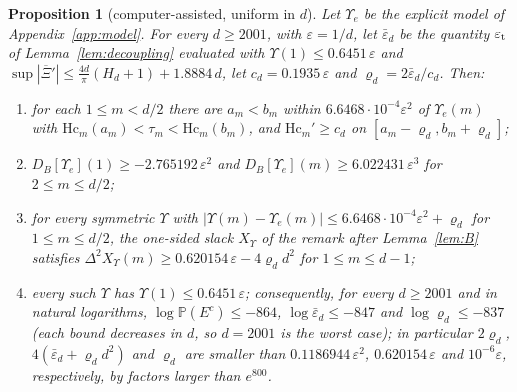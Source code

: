\documentclass[11pt]{amsart}
\newtheorem{proposition}[theorem]{Proposition}
\theoremstyle{definition}
\theoremstyle{remark}
\numberwithin{equation}{section}
\renewcommand{\Pr}{\mathbb{P}}
\newcommand{\Xb}{\overline{\Xi}}
\begin{document}
\begin{proposition}[computer-assisted, uniform in $d$]\label{prop:regimeIII}
Let $\Upsilon_e$ be the explicit model of Appendix~\ref{app:model}. For every $d\ge2001$, with $\varepsilon=1/d$, let
$\bar\varepsilon_d$ be the quantity $\varepsilon_{\rm t}$ of Lemma~\ref{lem:decoupling} evaluated with
$\Upsilon(1)\le0.6451\,\varepsilon$ and $\sup|\Xb'|\le\frac{4d}\pi(H_d+1)+1.8884\,d$, let $c_d=0.1935\,\varepsilon$ and
$\varrho_d=2\bar\varepsilon_d/c_d$. Then:
\begin{enumerate}
\item for each $1\le m<d/2$ there are $a_m<b_m$ within $6.6468\cdot10^{-4}\varepsilon^2$ of $\Upsilon_e(m)$ with
$\mathrm{Hc}_m(a_m)<\tau_m<\mathrm{Hc}_m(b_m)$, and $\mathrm{Hc}_m'\ge c_d$ on $[a_m-\varrho_d,b_m+\varrho_d]$;
\item $D_B[\Upsilon_e](1)\ge-2.765192\,\varepsilon^2$ and $D_B[\Upsilon_e](m)\ge6.022431\,\varepsilon^3$ for $2\le m\le d/2$;
\item for every symmetric $\Upsilon$ with $|\Upsilon(m)-\Upsilon_e(m)|\le6.6468\cdot10^{-4}\varepsilon^2+\varrho_d$ for
$1\le m\le d/2$, the one-sided slack $X_\Upsilon$ of the remark after Lemma~\ref{lem:B} satisfies
$\Delta^2X_\Upsilon(m)\ge0.620154\,\varepsilon-4\varrho_dd^2$ for $1\le m\le d-1$;
\item every such $\Upsilon$ has $\Upsilon(1)\le0.6451\,\varepsilon$; consequently, for every $d\ge2001$ and in
natural logarithms, $\log\Pr(E^c)\le-864$, $\log\bar\varepsilon_d\le-847$ and $\log\varrho_d\le-837$ (each bound
decreases in $d$, so $d=2001$ is the worst case); in particular $2\varrho_d$, $4(\bar\varepsilon_d+\varrho_dd^2)$ and
$\varrho_d$ are smaller than $0.1186944\,\varepsilon^2$, $0.620154\,\varepsilon$ and $10^{-6}\varepsilon$, respectively,
by factors larger than $e^{800}$.
\end{enumerate}
\end{proposition}
\end{document}
